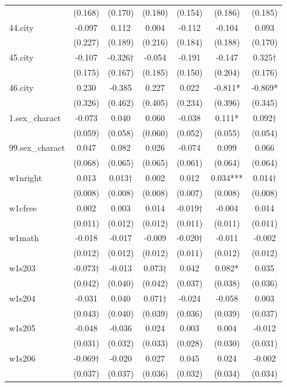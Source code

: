 \documentclass[]{article}
\begin{document}
\begin{tabular}{lcccccc}
 & (0.168) & (0.170) & (0.180) & (0.154) & (0.186) & (0.185) \\
44.city & -0.097 & 0.112 & 0.004 & -0.112 & -0.104 & 0.093 \\
 & (0.227) & (0.189) & (0.216) & (0.184) & (0.188) & (0.170) \\
45.city & -0.107 & -0.326† & -0.054 & -0.191 & -0.147 & 0.325† \\
 & (0.175) & (0.167) & (0.185) & (0.150) & (0.204) & (0.176) \\
46.city & 0.230 & -0.385 & 0.227 & 0.022 & -0.811* & -0.869* \\
 & (0.326) & (0.462) & (0.405) & (0.234) & (0.396) & (0.345) \\
1.sex\_charact & -0.073 & 0.040 & 0.060 & -0.038 & 0.111* & 0.092† \\
 & (0.059) & (0.058) & (0.060) & (0.052) & (0.055) & (0.054) \\
99.sex\_charact & 0.047 & 0.082 & 0.026 & -0.074 & 0.099 & 0.066 \\
 & (0.068) & (0.065) & (0.065) & (0.061) & (0.064) & (0.064) \\
w1nright & 0.013 & 0.013† & 0.002 & 0.012 & 0.034*** & 0.014† \\
 & (0.008) & (0.008) & (0.008) & (0.007) & (0.008) & (0.008) \\
w1cfree & 0.002 & 0.003 & 0.014 & -0.019† & -0.004 & 0.014 \\
 & (0.011) & (0.012) & (0.012) & (0.011) & (0.011) & (0.011) \\
w1math & -0.018 & -0.017 & -0.009 & -0.020† & -0.011 & -0.002 \\
 & (0.012) & (0.012) & (0.012) & (0.011) & (0.012) & (0.012) \\
w1s203 & -0.073† & -0.013 & 0.073† & 0.042 & 0.082* & 0.035 \\
 & (0.042) & (0.040) & (0.042) & (0.037) & (0.038) & (0.036) \\
w1s204 & -0.031 & 0.040 & 0.071† & -0.024 & -0.058 & 0.003 \\
 & (0.043) & (0.040) & (0.039) & (0.036) & (0.039) & (0.037) \\
w1s205 & -0.048 & -0.036 & 0.024 & 0.003 & 0.004 & -0.012 \\
 & (0.031) & (0.032) & (0.033) & (0.028) & (0.030) & (0.031) \\
w1s206 & -0.069† & -0.020 & 0.027 & 0.045 & 0.024 & -0.002 \\
 & (0.037) & (0.037) & (0.036) & (0.032) & (0.034) & (0.034) \\

\end{tabular}
\end{document}
